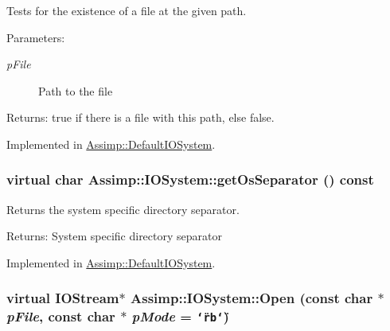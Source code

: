 Tests for the existence of a file at the given path. 

\begin{Desc}
\item[Parameters:]
\begin{description}
\item[{\em pFile}]Path to the file \end{description}
\end{Desc}
\begin{Desc}
\item[Returns:]true if there is a file with this path, else false. \end{Desc}


Implemented in \hyperlink{class_assimp_1_1_default_i_o_system_f8b310025faaed12c6d65c586e935255}{Assimp::DefaultIOSystem}.\hypertarget{class_assimp_1_1_i_o_system_40e412875b985bdb638f00ef0f20fff6}{
\subsubsection[getOsSeparator]{\setlength{\rightskip}{0pt plus 5cm}virtual char Assimp::IOSystem::getOsSeparator () const}}
\label{class_assimp_1_1_i_o_system_40e412875b985bdb638f00ef0f20fff6}


Returns the system specific directory separator. 

\begin{Desc}
\item[Returns:]System specific directory separator \end{Desc}


Implemented in \hyperlink{class_assimp_1_1_default_i_o_system_154a94adf38921d9fce50ef598f0a50c}{Assimp::DefaultIOSystem}.\hypertarget{class_assimp_1_1_i_o_system_c512ece3b0701de5682553007a4c0816}{
\subsubsection[Open]{\setlength{\rightskip}{0pt plus 5cm}virtual {\bf IOStream}$\ast$ Assimp::IOSystem::Open (const char $\ast$ {\em pFile}, \/  const char $\ast$ {\em pMode} = {\tt \char`\"{}rb\char`\"{}})}}
\label{class_assimp_1_1_i_o_system_c512ece3b0701de5682553007a4c0816}


